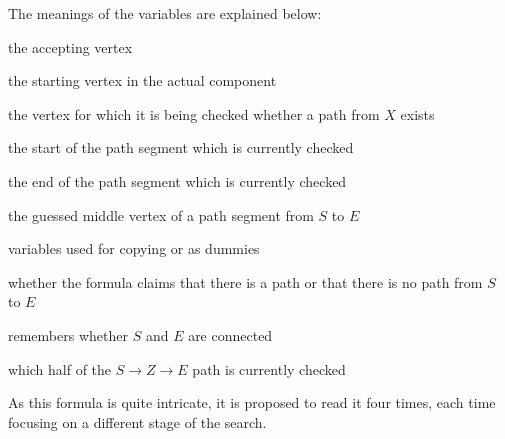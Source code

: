 The meanings of the variables are explained below:
\begin{description}
    \setlength\itemsep{0.15em}
    \item[$Y$:] the accepting vertex
    \item[$X$:] the starting vertex in the actual component
    \item[$I$:] the vertex for which it is being checked whether a path from $X$ exists
    \item[$S$:] the start of the path segment which is currently checked
    \item[$E$:] the end of the path segment  which is currently checked
    \item[$Z, Z_{e}$:] the guessed middle vertex of a path segment from $S$ to $E$
    \item[$A, B, b_{0}$:] variables used for copying or as dummies
    \item[$b_{path}$:] whether the formula claims that there is a path or that there is no path from $S$ to $E$
    \item[$b_{1}$:] remembers whether $S$ and $E$ are connected
    \item[$b_{2}, b_{2e}$:] which half of the $S \to Z \to E$ path is currently checked
\end{description}
As this formula is quite intricate, it is proposed to read it four times, each time focusing on a different stage of the search.
